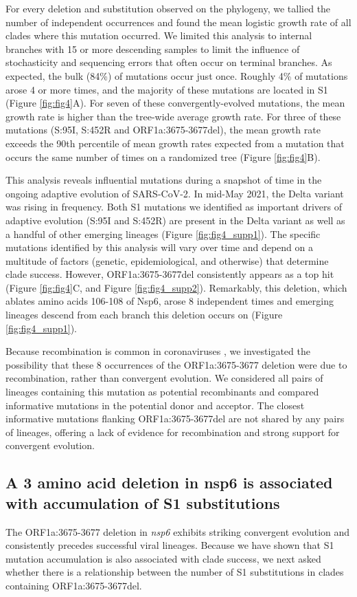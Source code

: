 \documentclass[12pt, letterpaper]{article}
\begin{document}
For every deletion and substitution observed on the phylogeny, we tallied the number of independent occurrences and found the mean logistic growth rate of all clades where this mutation occurred. We limited this analysis to internal branches with 15 or more descending samples to limit the influence of stochasticity and sequencing errors that often occur on terminal branches. As expected, the bulk (84\%) of mutations occur just once. Roughly 4\% of mutations arose 4 or more times, and the majority of these mutations are located in S1 (Figure \ref{fig:fig4}A). For seven of these convergently-evolved mutations, the mean growth rate is higher than the tree-wide average growth rate. For three of these mutations (S:95I, S:452R and ORF1a:3675-3677del), the mean growth rate exceeds the 90th percentile of mean growth rates expected from a mutation that occurs the same number of times on a randomized tree (Figure \ref{fig:fig4}B).

This analysis reveals influential mutations during a snapshot of time in the ongoing adaptive evolution of SARS-CoV-2. In mid-May 2021, the Delta variant was rising in frequency. Both S1 mutations we identified as important drivers of adaptive evolution (S:95I and S:452R) are present in the Delta variant as well as a handful of other emerging lineages (Figure \ref{fig:fig4_supp1}). The specific mutations identified by this analysis will vary over time and depend on a multitude of factors (genetic, epidemiological, and otherwise) that determine clade success. However, ORF1a:3675-3677del consistently appears as a top hit (Figure \ref{fig:fig4}C, and Figure \ref{fig:fig4_supp2}). Remarkably, this deletion, which ablates amino acids 106-108 of Nsp6, arose 8 independent times and emerging lineages descend from each branch this deletion occurs on (Figure \ref{fig:fig4_supp1}).

Because recombination is common in coronaviruses \citep{Muller2021-qq, Turkahia2021-ao}, we investigated the possibility that these 8 occurrences of the ORF1a:3675-3677 deletion were due to recombination, rather than convergent evolution. We considered all pairs of lineages containing this mutation as potential recombinants and compared informative mutations in the potential donor and acceptor. The closest informative mutations flanking ORF1a:3675-3677del are not shared by any pairs of lineages, offering a lack of evidence for recombination and strong support for convergent evolution.

\subsection*{A 3 amino acid deletion in nsp6 is associated with accumulation of S1 substitutions}
The ORF1a:3675-3677 deletion in \emph{nsp6} exhibits striking convergent evolution and consistently precedes successful viral lineages. Because we have shown that S1 mutation accumulation is also associated with clade success, we next asked whether there is a relationship between the number of S1 substitutions in clades containing ORF1a:3675-3677del.
\end{document}
